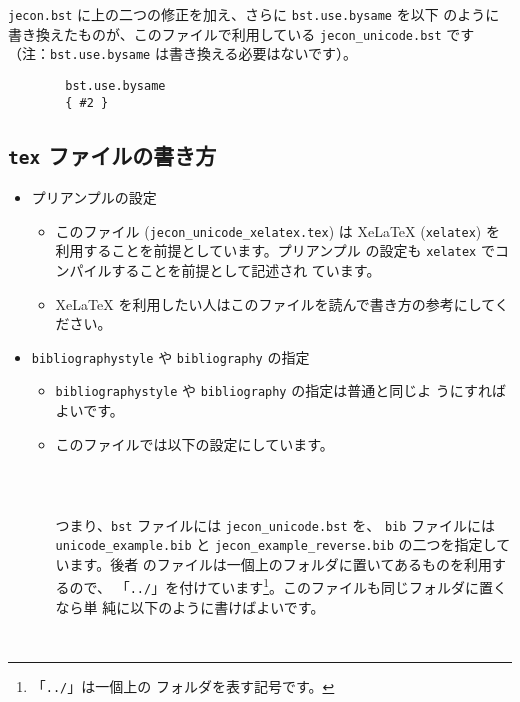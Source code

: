 \documentclass[a4paper,10pt]{bxjsarticle}
\begin{document}
\texttt{jecon.bst} に上の二つの修正を加え、さらに \texttt{bst.use.bysame} を以下
のように書き換えたものが、このファイルで利用している \texttt{jecon\_unicode.bst}
です（注：\texttt{bst.use.bysame} は書き換える必要はないです）。
\begin{verbatim}
        bst.use.bysame
        { #2 }
\end{verbatim}

\subsection{\texttt{tex} ファイルの書き方}

\begin{itemize}
 \item プリアンプルの設定
       \begin{itemize}
        \item このファイル (\texttt{jecon\_unicode\_xelatex.tex}) は XeLaTeX
              (\texttt{xelatex}) を利用することを前提としています。プリアンプル
              の設定も \texttt{xelatex} でコンパイルすることを前提として記述され
	      ています。
        \item XeLaTeX を利用したい人はこのファイルを読んで書き方の参考にしてく
              ださい。
       \end{itemize}
 \item \texttt{bibliographystyle} や \texttt{bibliography} の指定
       \begin{itemize}
	\item \texttt{bibliographystyle} や \texttt{bibliography} の指定は普通と同じよ
       うにすればよいです。
	\item このファイルでは以下の設定にしています。
\begin{verbatim}
           
            
\end{verbatim}
       つまり、\texttt{bst} ファイルには \texttt{jecon\_unicode.bst} を、
	      \texttt{bib} ファイルには \texttt{unicode\_example.bib} と
	      \texttt{jecon\_example\_reverse.bib} の二つを指定しています。後者
	      のファイルは一個上のフォルダに置いてあるものを利用するので、
	      「\texttt{../}」を付けています\footnote{「\texttt{../}」は一個上の
	      フォルダを表す記号です。}。このファイルも同じフォルダに置くなら単
	      純に以下のように書けばよいです。
\begin{verbatim}
            
\end{verbatim}
       \end{itemize}
\end{itemize}
\end{document}
